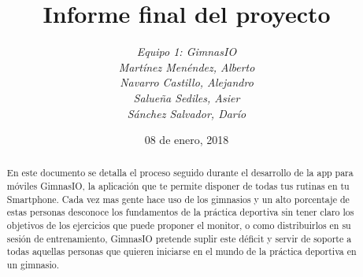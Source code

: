 \documentclass[11pt,a4paper]{report}
\author{\textit{Equipo 1: GimnasIO
		\\Martínez Menéndez, Alberto %
		\\Navarro Castillo, Alejandro %
 		\\Salueña Sediles, Asier %
 		\\Sánchez Salvador, Darío %
 	}}
\title{\textbf{Informe final del proyecto}}
\date{08 de enero, 2018}
\begin{document}
\maketitle
\titlepage
\begin{abstract}
	En este documento se detalla el proceso seguido durante el desarrollo de la app para móviles GimnasIO, la aplicación que te permite disponer de todas tus rutinas en tu Smartphone. Cada vez mas gente hace uso de los gimnasios y un alto porcentaje de estas personas desconoce los fundamentos de la práctica deportiva sin tener claro los objetivos de los ejercicios que puede proponer el monitor, o como distribuirlos en su sesión de entrenamiento, GimnasIO pretende suplir este déficit y servir de soporte a todas aquellas personas que quieren iniciarse en el mundo de la práctica deportiva en un gimnasio.
\end{abstract}
\newpage
\tableofcontents
\end{document}
